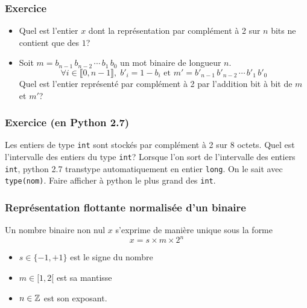 \begin{frame}
  \frametitle{Exercice}
\begin{itemize}
  \item Quel est l'entier $x$ dont la représentation par complément à 2 sur $n$ bits ne contient que des $1$?
  \item Soit $m = b_{n-1}\,b_{n-2}\,\cdots\,b_1\,b_0$ un mot binaire de longueur $n$.
\begin{displaymath}
  \forall i\in \llbracket 0,n-1\rrbracket, \; b'_i = 1-b_i \text{ et } m' = b'_{n-1}\,b'_{n-2}\,\cdots\,b'_1\,b'_0
\end{displaymath}
  Quel est l'entier représenté par complément à 2 par l'addition bit à bit de $m$ et $m'$? 
\end{itemize}
\end{frame}

\begin{frame}
  \frametitle{Exercice (en Python 2.7)}
Les entiers de type \texttt{int} sont stockés par complément à 2 sur 8 octets. Quel est l'intervalle des entiers du type \texttt{int}?\newline
Lorsque l'on sort de l'intervalle des entiers \texttt{int}, python 2.7 transtype automatiquement en entier \texttt{long}. On le sait avec \texttt{type(nom)}.\newline
Faire afficher à python le plus grand des \texttt{int}.
\end{frame}

\begin{frame}
  \frametitle{Représentation flottante normalisée d'un binaire}
Un nombre binaire non nul $x$ s'exprime de manière unique sous la forme
\begin{displaymath}
 x = s\times m\times 2^n 
\end{displaymath}
\begin{itemize}
  \item $s\in\{-1,+1\}$ est le signe du nombre
  \item $m\in [1,2[$ est sa mantisse
  \item $n\in \mathbb{Z}$ est son exposant.  
\end{itemize}
\end{frame}

